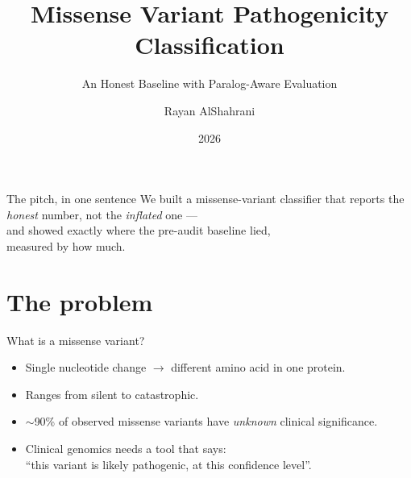 \documentclass[aspectratio=169]{beamer}
\title{Missense Variant Pathogenicity Classification}
\subtitle{An Honest Baseline with Paralog-Aware Evaluation}
\author{Rayan AlShahrani}
\institute{King Khalid University \\ Computer Science Graduation Project}
\date{2026}
\begin{document}
\maketitle

\begin{frame}{The pitch, in one sentence}
  \vspace{0.6cm}
  \centering
  \large We built a missense-variant classifier that reports the
  \\ \vspace{0.3em} \emph{honest} number, not the \emph{inflated}
  one --- \\[0.6em]
  \large and showed exactly where the pre-audit baseline lied,
  \\ measured by how much.
\end{frame}


\section{The problem}

\begin{frame}{What is a missense variant?}
  \begin{itemize}
    \item Single nucleotide change $\to$ different amino acid in one
          protein.
    \item Ranges from silent to catastrophic.
    \item $\sim$90\% of observed missense variants have \emph{unknown}
          clinical significance.
    \item Clinical genomics needs a tool that says: \\
          \alert{``this variant is likely pathogenic, at this confidence
          level''}.
  \end{itemize}
\end{frame}
\end{document}
